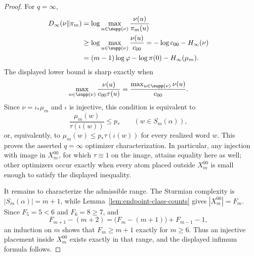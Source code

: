 \begin{proof}
For \(q=\infty\),
\[
\begin{aligned}
D_\infty(\nu\|\pi_m)
&=
\log\max_{u\in\supp(\nu)}\frac{\nu(u)}{\pi_m(u)}\\
&\ge
\log\max_{u\in\supp(\nu)}\frac{\nu(u)}{c_{00}}
=
-\log c_{00}-H_\infty(\nu)\\
&=
(m-1)\log\varphi-\log\pi(0)-H_\infty(\mu_m).
\end{aligned}
\]
The displayed lower bound is sharp exactly when
\[
\max_{u\in\supp(\nu)}\frac{\nu(u)}{c_{00}\tau(u)}
=
\frac{\max_{u\in\supp(\nu)}\nu(u)}{c_{00}}.
\]
Since \(\nu=\iota_*\mu_m\) and \(\iota\) is injective, this condition is
equivalent to
\[
\frac{\mu_m(w)}{\tau(\iota(w))}\le p_*
\qquad (w\in S_m(\alpha)),
\]
or, equivalently, to
\(\mu_m(w)\le p_*\tau(\iota(w))\) for every realized word \(w\).  This proves
the asserted \(q=\infty\) optimizer characterization.  In particular, any
injection with image in \(X_m^{00}\), for which \(\tau\equiv1\) on the image,
attains equality here as well; other optimizers occur exactly when every atom
placed outside \(X_m^{00}\) is small enough to satisfy the displayed
inequality.

It remains to characterize the admissible range. The Sturmian complexity is
\(|S_m(\alpha)|=m+1\), while Lemma~\ref{lem:endpoint-class-counts} gives
\(|X_m^{00}|=F_m\). Since \(F_5=5<6\) and \(F_6=8\ge7\), and
\[
F_{m+1}-(m+2)=\bigl(F_m-(m+1)\bigr)+F_{m-1}-1,
\]
an induction on \(m\) shows that \(F_m\ge m+1\) exactly for \(m\ge6\). Thus
an injective placement inside \(X_m^{00}\) exists exactly in that range, and
the displayed infimum formula follows.
\end{proof}
